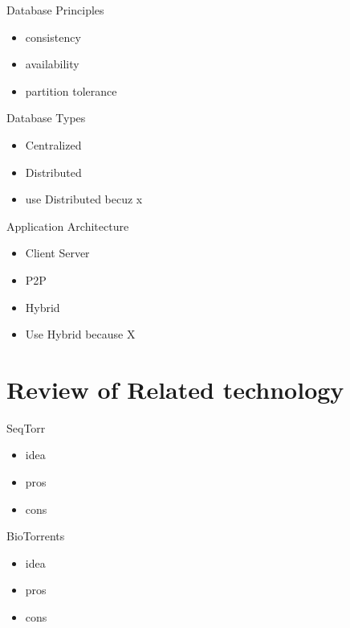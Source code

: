 \documentclass{beamer}
\begin{document}
\begin{frame}{Database Principles}
  \begin{itemize}   
    \item consistency
    \item availability
    \item partition tolerance
  \end{itemize}
\end{frame}

\begin{frame}{Database Types}
  \begin{itemize}   
    \item Centralized
    \item Distributed
    \item use Distributed becuz x
  \end{itemize}
\end{frame}

\begin{frame}{Application Architecture}
  \begin{itemize}   
    \item Client Server
    \item P2P
    \item Hybrid
    \item Use Hybrid because X
  \end{itemize}
\end{frame}

\section{Review of Related technology}

\begin{frame}{SeqTorr}
  \begin{itemize}   
    \item idea
    \item pros
    \item cons
  \end{itemize}
\end{frame}

\begin{frame}{BioTorrents}
  \begin{itemize}   
    \item idea
    \item pros
    \item cons
  \end{itemize}
\end{frame}
\end{document}
